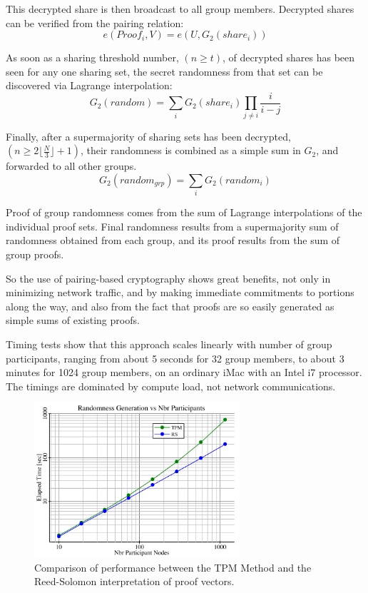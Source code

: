 \documentclass{yellowpaper}
\begin{document}
This decrypted share is then broadcast to all group members. Decrypted shares can be verified from the pairing relation:
$$ e(Proof_i, V) = e(U, G_2(share_i))$$

As soon as a sharing threshold number, $(n \ge t)$, of decrypted shares has been seen for any one sharing set, the secret randomness from that set can be discovered via Lagrange interpolation:
$$G_2(random) = \sum_i G_2(share_i) \prod_{j \ne i} \frac{i}{i-j}$$

Finally, after a supermajority of sharing sets has been decrypted, $(n \ge 2 \lfloor \frac{N}{3} \rfloor + 1)$, their randomness is combined as a simple sum in $G_2$, and forwarded to all other groups.
$$G_2(random_{grp}) = \sum_i G_2(random_i)$$

Proof of group randomness comes from the sum of Lagrange interpolations of the individual proof sets.
Final randomness results from a supermajority sum of randomness obtained from each group, and its proof results from the sum of group proofs. 

So the use of pairing-based cryptography shows great benefits, not only in minimizing network traffic, and by making immediate commitments to portions along the way, and also from the fact that proofs are so easily generated as simple sums of existing proofs.

Timing tests show that this approach scales linearly with number of group participants, ranging from about 5 seconds for 32 group members, to about 3 minutes for 1024 group members, on an ordinary iMac with an Intel i7 processor. The timings are dominated by compute load, not network communications.

\begin{figure}[h!]
  \centering
  \includegraphics[width=3in]{randtimings}
  \caption{ Comparison of performance between the TPM Method and the Reed-Solomon interpretation of proof vectors.}
  \label{fig:randtimings}
\end{figure}
\end{document}
